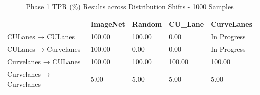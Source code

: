 \begin{table}
\caption{Phase 1 TPR (\%) Results across Distribution Shifts - 1000 Samples}
\label{tab:phase1_tpr_1000}
\begin{tabular}{lllll}
\toprule
 & ImageNet & Random & CU_Lane & CurveLanes \\
\midrule
CULanes → CULanes & 100.00 & 100.00 & 0.00 & In Progress \\
CULanes → Curvelanes & 100.00 & 0.00 & 0.00 & In Progress \\
Curvelanes → CULanes & 100.00 & 100.00 & 100.00 & 100.00 \\
Curvelanes → Curvelanes & 5.00 & 5.00 & 5.00 & 5.00 \\
\bottomrule
\end{tabular}
\end{table}
